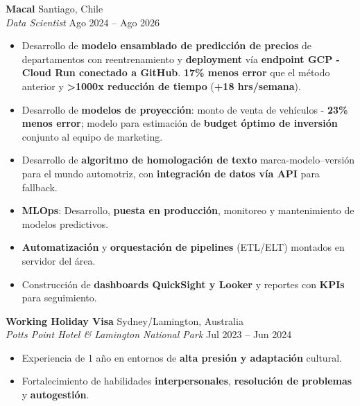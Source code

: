 \documentclass[a4paper,10.5pt]{extarticle}
\begin{document}
\vspace{4pt}

\textbf{Macal} \hfill Santiago, Chile\\
\textit{Data Scientist} \hfill Ago 2024 -- Ago 2026
\begin{itemize}
    \item Desarrollo de \textbf{modelo ensamblado de predicción de precios} de departamentos con reentrenamiento y \textbf{deployment} vía \textbf{endpoint GCP - Cloud Run conectado a GitHub}. \textbf{17\% menos error} que el método anterior y \textbf{>1000x reducción de tiempo} (\textbf{+18 hrs/semana}).
    \item Desarrollo de \textbf{modelos de proyección}: monto de venta de vehículos - \textbf{23\% menos error}; modelo para estimación de \textbf{budget óptimo de inversión} conjunto al equipo de marketing.
    \item Desarrollo de \textbf{algoritmo de homologación de texto} marca-modelo--versión para el mundo automotriz, con \textbf{integración de datos vía API} para fallback.
    \item \textbf{MLOps}: Desarrollo, \textbf{puesta en producción}, monitoreo y mantenimiento de modelos predictivos.
    \item \textbf{Automatización} y \textbf{orquestación de pipelines} (ETL/ELT) montados en servidor del área.
    \item Construcción de \textbf{dashboards QuickSight y Looker} y reportes con \textbf{KPIs} para seguimiento.
\end{itemize}

\vspace{4pt}

\textbf{Working Holiday Visa} \hfill Sydney/Lamington, Australia\\
\textit{Potts Point Hotel \& Lamington National Park} \hfill Jul 2023 -- Jun 2024
\begin{itemize}
    \item Experiencia de 1 año en entornos de \textbf{alta presión y adaptación} cultural.
    \item Fortalecimiento de habilidades \textbf{interpersonales}, \textbf{resolución de problemas} y \textbf{autogestión}.
\end{itemize}

\vspace{4pt}
\end{document}
